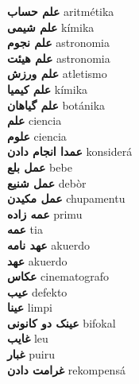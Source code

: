 \textbf{ علم حساب  } aritmétika \\
\textbf{ علم شیمی  } kímika \\
\textbf{ علم نجوم  } astronomia \\
\textbf{ علم هیئت  } astronomia \\
\textbf{ علم ورزش  } atletismo \\
\textbf{ علم کیمیا  } kímika \\
\textbf{ علم گیاهان  } botánika \\
\textbf{ علم  } ciencia \\
\textbf{ علوم  } ciencia \\
\textbf{ عمدا انجام دادن  } konsiderá \\
\textbf{ عمل بلع  } bebe \\
\textbf{ عمل شنیع  } debòr \\
\textbf{ عمل مکیدن  } chupamentu \\
\textbf{ عمه زاده  } primu \\
\textbf{ عمه  } tia \\
\textbf{ عهد نامه  } akuerdo \\
\textbf{ عهد  } akuerdo \\
\textbf{ عکاس  } cinematografo \\
\textbf{ عیب  } defekto \\
\textbf{ عینا  } limpi \\
\textbf{ عینک دو کانونی  } bifokal \\
\textbf{ غایب  } leu \\
\textbf{ غبار  } puiru \\
\textbf{ غرامت دادن  } rekompensá \\
